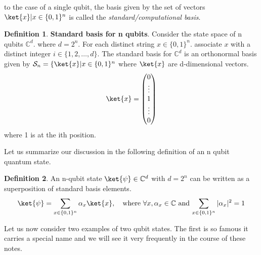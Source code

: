 \documentclass[12pt, oneside]{book}
\theoremstyle{definition}
\newtheorem{definition}{Definition}[section]
\theoremstyle{definition}
\theoremstyle{remark}
\begin{document}
to the case of a single qubit, the basis given by the set of vectors ${\ket{x} | x \in \{0,1\}^n}$ is called the
\textit{standard/computational basis}.

\begin{definition}
    \textbf{Standard basis for n qubits}. Consider the state space of n qubits $\mathbb{C}^d$. where $d=2^n$. For each distinct string $x \in \{0,1\}^n$. associate $x$ with a distinct integer $i \in \{1,2,\ldots ,d\}$. The standard basis for $\mathbb{C}^d$ is an orthonormal basis given by $\mathcal{S}_n=\{\ket{x} | x \in \{0,1\}^n$
    where $\ket{x}$ are d-dimensional vectors.
    \[
    \ket{x}=\begin{pmatrix} 0 \\ \vdots \\  1 \\ \vdots \\ 0 \end{pmatrix}
    \]
    where 1 is at the ith position.
\end{definition}
Let us summarize our discussion in the following definition of an n qubit quantum state.
\begin{definition}
    An n-qubit state $\ket{\psi} \in \mathbb{C}^d$ with $d=2^n$ can be written as a superposition of standard basis elements.
    \[
    \ket{\psi} = \sum_{x\in\{0,1\}^n}\alpha_x\ket{x}, \quad \text{where $\forall x, \alpha_x \in \mathbb{C}$ and $\sum_{x \in \{0,1\}^n} |\alpha_x|^2=1$}
    \]
\end{definition}
Let us now consider two examples of two qubit states. The first is so famous it carries a special
name and we will see it very frequently in the course of these notes.
\end{document}
